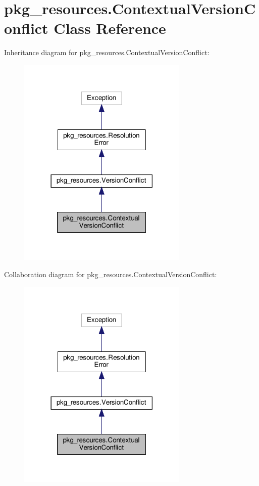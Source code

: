\hypertarget{classpkg__resources_1_1ContextualVersionConflict}{}\section{pkg\+\_\+resources.\+Contextual\+Version\+Conflict Class Reference}
\label{classpkg__resources_1_1ContextualVersionConflict}


Inheritance diagram for pkg\+\_\+resources.\+Contextual\+Version\+Conflict\+:
\nopagebreak
\begin{figure}[H]
\begin{center}
\leavevmode
\includegraphics[width=230pt]{classpkg__resources_1_1ContextualVersionConflict__inherit__graph}
\end{center}
\end{figure}


Collaboration diagram for pkg\+\_\+resources.\+Contextual\+Version\+Conflict\+:
\nopagebreak
\begin{figure}[H]
\begin{center}
\leavevmode
\includegraphics[width=230pt]{classpkg__resources_1_1ContextualVersionConflict__coll__graph}
\end{center}
\end{figure}
